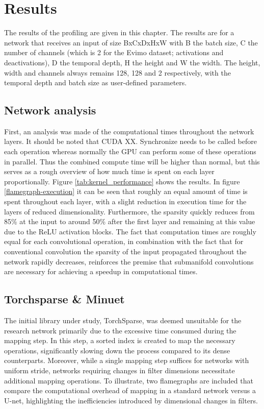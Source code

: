 \documentclass{article}
\begin{document}
\section{Results}
\label{Results}
The results of the profiling are given in this chapter. The results are for a network that receives an input of size BxCxDxHxW with B the batch size, C the number of channels (which is 2 for the Evimo dataset; activations and deactivations), D the temporal depth, H the height and W the width. The height, width and channels always remains 128, 128 and 2 respectively, with the temporal depth and batch size as user-defined parameters. 

\subsection{Network analysis}
First, an analysis was made of the computational times throughout the network layers. It should be noted that CUDA XX. Synchronize needs to be called before each operation whereas normally the GPU can perform some of these operations in parallel. Thus the combined compute time will be higher than normal, but this serves as a rough overview of how much time is spent on each layer proportionally. Figure \ref{tab:kernel_performance} shows the results. In figure \ref{flamegraph-execution} it can be seen that roughly an equal amount of time is spent throughout each layer, with a slight reduction in execution time for the layers of reduced dimensionality. Furthermore, the sparsity quickly reduces from 85\% at the input to around 50\% after the first layer and remaining at this value due to the ReLU activation blocks. The fact that computation times are roughly equal for each convolutional operation, in combination with the fact that for conventional convolution the sparsity of the input propagated throughout the network rapidly decreases, reinforces the premise that submanifold convolutions are necessary for achieving a speedup in computational times. 




\subsection{Torchsparse \& Minuet}
The initial library under study, TorchSparse, was deemed unsuitable for the research network primarily due to the excessive time consumed during the mapping step. In this step, a sorted index is created to map the necessary operations, significantly slowing down the process compared to its dense counterparts. Moreover, while a single mapping step suffices for networks with uniform stride, networks requiring changes in filter dimensions necessitate additional mapping operations. To illustrate, two flamegraphs are included that compare the computational overhead of mapping in a standard network versus a U-net, highlighting the inefficiencies introduced by dimensional changes in filters. 
\end{document}

